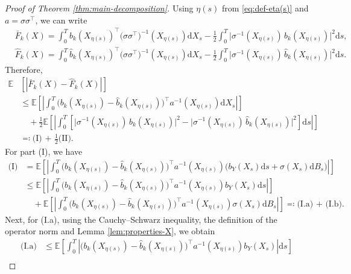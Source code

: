 \documentclass{article}
\theoremstyle{plain}
\theoremstyle{definition}
\theoremstyle{remark}
\renewcommand{\d}{\mathrm{d}}
\newcommand{\EE}{\mathbb{E}}
\begin{document}
\begin{proof}[Proof of Theorem \ref{thm:main-decomposition}]
Using $\eta(s)$ from \eqref{eq:def-eta(s)} and $a=\sigma\sigma^{\top}$, we can write
\begin{align}\label{eq:F-bar-rewrite}
&\bar{F}_k(X)
= \int_{0}^{T}b_k(X_{\eta(s)})^{\top} \big(\sigma\sigma^{\top}\big)^{-1}(X_{\eta(s)})\d X_s - \frac{1}{2}\int_{0}^{T} \big\lvert \sigma^{-1} (X_{\eta(s)})\,b_k(X_{\eta(s)}) \big\rvert^2 \d s,\nonumber\\
&\widehat{F}_k(X)=\int_{0}^{T} \widehat{b}_k(X_{\eta(s)})^{\top} \big(\sigma\sigma^{\top}\big)^{-1}(X_{\eta(s)})\d X_s - \frac{1}{2}\int_{0}^{T} \big\lvert \sigma^{-1} (X_{\eta(s)})\,\widehat{b}_k(X_{\eta(s)}) \big\rvert^2 \d s.
\end{align}
Therefore, 
\begin{align}\label{eq:part-I-and-II}
    \EE &\left[ |\bar F_k(X)-\widehat F_k(X)|\right]\nonumber\\
    &\leq  \EE \left[\left|\int_{0}^T \big( b_k(X_{\eta(s)})-\widehat b_k(X_{\eta(s)})\big)^{\top}a^{-1}(X_{\eta(s)})\d X_s\right|\right]\nonumber\\
     &\quad +\frac{1}{2}\EE \left[\left|\int_0^T \left[\big\lvert \sigma^{-1} (X_{\eta(s)})\,b_k(X_{\eta(s)}) \big\rvert^2-\big\lvert \sigma^{-1} (X_{\eta(s)})\,\widehat{b}_k(X_{\eta(s)}) \big\rvert^2\right]\d s\right|\right]\nonumber\\
     &\eqqcolon \text{(I) + $\frac{1}{2}$(II)}.
\end{align}
For part (I), we have
\begin{align}\label{eq:I}
 \text{(I)} & =   \EE \left[\left|\int_{0}^T \big( b_k(X_{\eta(s)})-\widehat b_k(X_{\eta(s)})\big)^{\top}a^{-1}(X_{\eta(s)})\Big(b_Y(X_s) \d s + \sigma(X_s) \d B_s \Big)\right|\right]\nonumber\\
 & \leq \EE \left[\left|\int_{0}^T \big( b_k(X_{\eta(s)})-\widehat b_k(X_{\eta(s)})\big)^{\top}a^{-1}(X_{\eta(s)})b_Y(X_s) \d s \right|\right]\nonumber\\
 &\quad +\EE \left[\left|\int_{0}^T \big( b_k(X_{\eta(s)})-\widehat b_k(X_{\eta(s)})\big)^{\top}a^{-1}(X_{\eta(s)})\sigma(X_s) \d B_s \right|\right]\eqqcolon \text{(I.a) + (I.b)}.
\end{align}
Next, for (I.a), using the Cauchy–Schwarz inequality, the definition of the operator norm and Lemma \ref{lem:properties-X},  we obtain 
\begin{align}\label{eq:I-a}
    \text{(I.a)}&\leq \EE \left[\int_{0}^T \left|\big( b_k(X_{\eta(s)})-\widehat b_k(X_{\eta(s)})\big)^{\top}a^{-1}(X_{\eta(s)})b_Y(X_s) \right|\d s \right]\nonumber\\

\end{align}
\end{proof}
\end{document}
